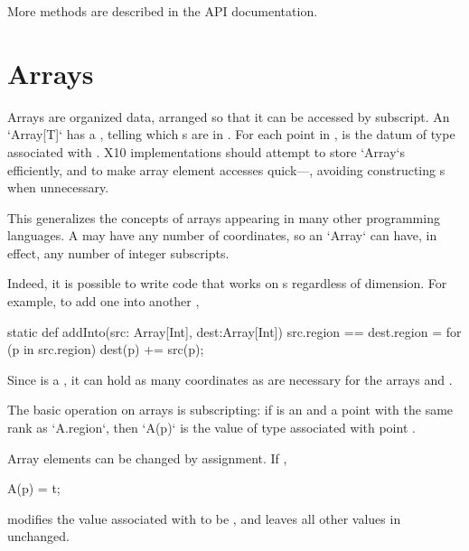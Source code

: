More  methods are described in the API documentation.

\section{Arrays}

Arrays are organized data, arranged so that it can be accessed by subscript.
An \xcd`Array[T]`  has a  , telling which
s are in .  For each point  in ,
 is the datum of type  associated with .  X10
implementations should 
attempt to store \xcd`Array`s efficiently, and to make array element accesses
quick---\eg, avoiding constructing s when unnecessary.

This generalizes the concepts of arrays appearing in many other programming
languages.  A  may have any number of coordinates, so an
\xcd`Array` can have, in effect, any number of integer subscripts.  

Indeed, it is possible to write code that works on s regardless 
of dimension.  For example, to add one   into another
, 
\begin{xten}
static def addInto(src: Array[Int], dest:Array[Int])
  {src.region == dest.region}
  = {
    for (p in src.region) 
       dest(p) += src(p);
  }
\end{xten}
\noindent
Since  is a , it can hold as many coordinates as are
necessary for the arrays  and .

The basic operation on arrays is subscripting: if  is an 
and  a point with the same rank as \xcd`A.region`, then
\xcd`A(p)`
is the value of type  associated with point .

Array elements can be changed by assignment. If , 
\begin{xten}
A(p) = t;
\end{xten}
modifies the value associated with  to be , and leaves all other
values in  unchanged.

